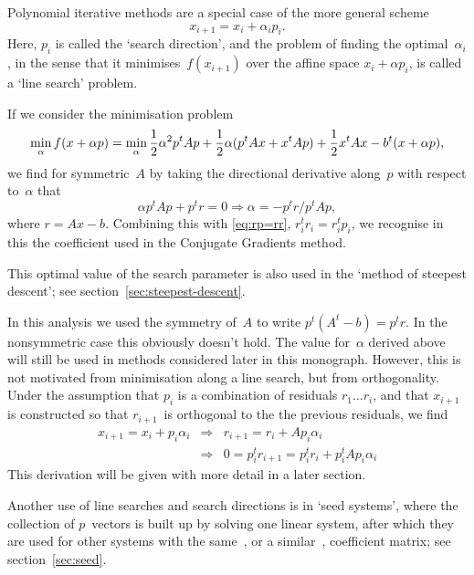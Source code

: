 Polynomial iterative methods are a special case of the more general
scheme \[x_{i+1}=x_i+\alpha_ip_i.\] Here, $p_i$ is called the `search
direction', and the problem of finding the optimal~$\alpha_i$, in the
sense that it minimises~$f(x_{i+1})$ over the affine space $x_i+\alpha p_i$,
is called a `line search' problem.

If we consider the minimisation
problem \[\min_\alpha f(x+\alpha p)=\min_\alpha {1\over2}\alpha^2p^tAp
+ {1\over2}\alpha(p^tAx+x^tAp)+{1\over2}x^tAx-b^t(x+\alpha p),\] we
find for symmetric~$A$ by taking the directional derivative along~$p$ with
respect to~$\alpha$ that 
\begin{equation} \alpha p^tAp+p^tr=0 \Rightarrow \alpha=-p^tr/p^tAp,
    \label{eq:line-search-alpha}\end{equation}
where $r=Ax-b$.
Combining this with \eqref{eq:rp=rr}, $r_i^tr_i=r_i^tp_i$, we
recognise in this the coefficient used in the Conjugate Gradients method.

This optimal value of the search parameter is also used in the `method
of steepest descent'; see section~\ref{sec:steepest-descent}.

In this analysis we used the symmetry of~$A$ to write
$p^t(A^t-b)=p^tr$. In the nonsymmetric case this obviously doesn't hold.
The value for~$\alpha$ derived above will still be used in methods
considered later in this monograph. However, this is not motivated
from minimisation along a line search, but from orthogonality. Under
the assumption that $p_i$ is a combination of residuals $r_1\ldots
r_i$, and that $x_{i+1}$ is constructed so that $r_{i+1}$~is
orthogonal to the the previous residuals, we find
\begin{eqnarray*}
x_{i+1}=x_i+p_i\alpha_i&\Rightarrow&r_{i+1}=r_i+Ap_i\alpha_i\\
&\Rightarrow&0=p_i^tr_{i+1}=p_i^tr_i+p_i^tAp_i\alpha_i
\end{eqnarray*}
This derivation will be given with more detail in a later section.

Another use of line searches and 
search directions is in `seed systems', where the collection of $p$~vectors is built up by solving
one linear system, after which they are used for other systems with
the same~\cite{ChanWan:analysis-projection,SmithPetMit:cg-multiple},
or a similar~\cite{ChanNg:Galerkin-multiple}, coefficient matrix; see
section~\ref{sec:seed}.


